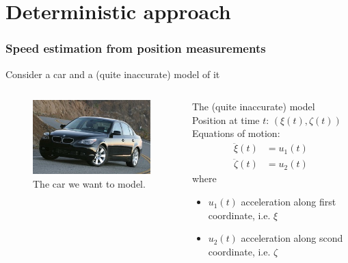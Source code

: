 \section{Deterministic approach}
\begin{frame} 
	\frametitle{Speed estimation from position measurements} 
	Consider a car and a (quite inaccurate) model of it
	\begin{columns}[onlytextwidth]
		\begin{figure}[h]
			\includegraphics[width=\textwidth]{fig/auto_real}%
			\caption*{The car we want to model.\footnotemark} 
		\end{figure}
		\begin{block}{The (quite inaccurate) model}
		Position at time $t$: $(\xi(t), \zeta(t))$ \\%
		Equations of motion:
		\begin{align*}
		  \ddot{\xi}(t)& = u_1(t) \\
		  \ddot{\zeta}(t)& = u_2(t)
		\end{align*}
		where 
		\begin{itemize}
			\item $u_1(t)$ acceleration along first coordinate, i.e. $\xi$\\
			\item $u_2(t)$ acceleration along scond coordinate, i.e. $\zeta$ 
		\end{itemize}
		\end{block}
	\end{columns}
	
	
\end{frame}


